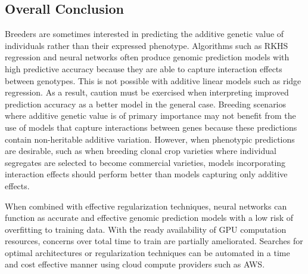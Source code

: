 \ifdefined\showtablesandfigures
\fi

\subsection*{Overall Conclusion}

Breeders are sometimes interested in predicting the additive genetic value of 
individuals rather than their expressed phenotype. Algorithms such as 
RKHS regression and neural networks often produce genomic prediction 
models with high predictive accuracy because they are able to capture 
interaction effects between genotypes. This is not possible with additive 
linear models such as ridge regression. As a result, caution must be exercised 
when interpreting improved prediction accuracy as a better model in the 
general case. Breeding scenarios where additive genetic value is of primary 
importance may not benefit from the use of models that capture interactions
between genes because these predictions contain non-heritable additive
variation. However, when phenotypic predictions are desirable, such 
as when breeding clonal crop varieties where individual segregates are 
selected to become commercial varieties, models incorporating interaction 
effects should perform better than models capturing only additive effects.

When combined with effective regularization techniques, neural networks can function
as accurate and effective genomic prediction models with a low risk of overfitting
to training data. With the ready availability of GPU computation resources, concerns
over total time to train are partially ameliorated. Searches for optimal architectures or 
regularization techniques can be automated in a time and cost effective 
manner using cloud compute providers such as AWS.

